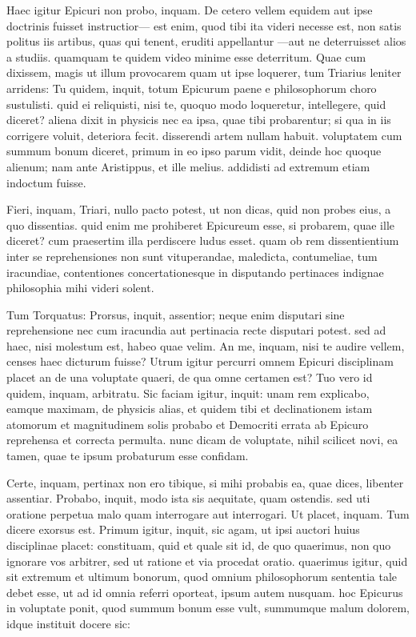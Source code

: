  Haec igitur Epicuri non probo, inquam. De cetero vellem equidem aut ipse doctrinis fuisset instructior— est enim, quod tibi ita videri necesse est, non satis politus iis artibus, quas qui tenent, eruditi appellantur —aut ne deterruisset alios a studiis. quamquam te quidem video minime esse deterritum. Quae cum dixissem, magis ut illum provocarem quam ut ipse loquerer, tum Triarius leniter arridens: Tu quidem, inquit, totum Epicurum paene e philosophorum choro sustulisti. quid ei reliquisti, nisi te, quoquo modo loqueretur, intellegere, quid diceret? aliena dixit in physicis nec ea ipsa, quae tibi probarentur; si qua in iis corrigere voluit, deteriora fecit. disserendi artem nullam habuit. voluptatem cum summum bonum diceret, primum in eo ipso parum vidit, deinde hoc quoque alienum; nam ante Aristippus, et ille melius. addidisti ad extremum etiam indoctum fuisse.

 Fieri, inquam, Triari, nullo pacto potest, ut non dicas, quid non probes eius, a quo dissentias. quid enim me prohiberet Epicureum esse, si probarem, quae ille diceret? cum praesertim illa perdiscere ludus esset. quam ob rem dissentientium inter se reprehensiones non sunt vituperandae, maledicta, contumeliae, tum iracundiae, contentiones concertationesque in disputando pertinaces indignae philosophia mihi videri solent.

 Tum Torquatus: Prorsus, inquit, assentior; neque enim disputari sine reprehensione nec cum iracundia aut pertinacia recte disputari potest. sed ad haec, nisi molestum est, habeo quae velim. An me, inquam, nisi te audire vellem, censes haec dicturum fuisse? Utrum igitur percurri omnem Epicuri disciplinam placet an de una voluptate quaeri, de qua omne certamen est? Tuo vero id quidem, inquam, arbitratu. Sic faciam igitur, inquit: unam rem explicabo, eamque maximam, de physicis alias, et quidem tibi et declinationem istam atomorum et magnitudinem solis probabo et Democriti errata ab Epicuro reprehensa et correcta permulta. nunc dicam de voluptate, nihil scilicet novi, ea tamen, quae te ipsum probaturum esse confidam.

 Certe, inquam, pertinax non ero tibique, si mihi probabis ea, quae dices, libenter assentiar. Probabo, inquit, modo ista sis aequitate, quam ostendis. sed uti oratione perpetua malo quam interrogare aut interrogari. Ut placet, inquam. Tum dicere exorsus est. Primum igitur, inquit, sic agam, ut ipsi auctori huius disciplinae placet: constituam, quid et quale sit id, de quo quaerimus, non quo ignorare vos arbitrer, sed ut ratione et via procedat oratio. quaerimus igitur, quid sit extremum et ultimum bonorum, quod omnium philosophorum sententia tale debet esse, ut ad id omnia referri oporteat, ipsum autem nusquam. hoc Epicurus in voluptate ponit, quod summum bonum esse vult, summumque malum dolorem, idque instituit docere sic:

